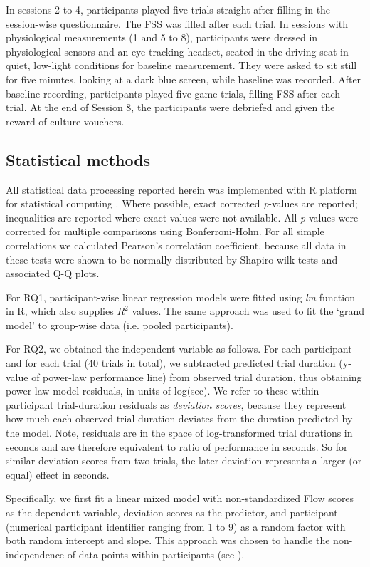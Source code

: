 \documentclass{frontierstyle/frontiersSCNS}
\begin{document}
In sessions 2 to 4, participants played five trials straight after filling in the session-wise questionnaire. The FSS was filled after each trial. In sessions with physiological measurements (1 and 5 to 8), participants were dressed in physiological sensors and an eye-tracking headset, seated in the driving seat in quiet, low-light conditions for baseline measurement. They were asked to sit still for five minutes, looking at a dark blue screen, while baseline was recorded. After baseline recording, participants played five game trials, filling FSS after each trial. At the end of Session 8, the participants were debriefed and given the reward of culture vouchers.

\subsection{Statistical methods}
All statistical data processing reported herein was implemented with {\sf R} platform for statistical computing \citep{R2014}. Where possible, exact corrected {\it p}-values are reported; inequalities are reported where exact values were not available. All {\it p}-values were corrected for multiple comparisons using Bonferroni-Holm. For all simple correlations we calculated Pearson's correlation coefficient, because all data in these tests were shown to be normally distributed by Shapiro-wilk tests and associated Q-Q plots.

For {\sf RQ1}, participant-wise linear regression models were fitted using {\it lm} function in {\sf R}, which also supplies $R^2$ values. The same approach was used to fit the `grand model' to group-wise data (i.e. pooled participants).

For {\sf RQ2}, we obtained the independent variable as follows. For each participant and for each trial (40 trials in total), we subtracted predicted trial duration (y-value of power-law performance line) from observed trial duration, thus obtaining power-law model residuals, in units of log(sec). We refer to these within-participant trial-duration residuals as {\it deviation scores}, because they represent how much each observed trial duration deviates from the duration predicted by the model. Note, residuals are in the space of log-transformed trial durations in seconds and are therefore equivalent to ratio of performance in seconds. So for similar deviation scores from two trials, the later deviation represents a larger (or equal) effect in seconds.

Specifically, we first fit a linear mixed model with non-standardized Flow scores as the dependent variable, deviation scores as the predictor, and participant (numerical participant identifier ranging from 1 to 9) as a random factor with both random intercept and slope. This approach was chosen to handle the non-independence of data points within participants (see \cite{Bates2015_lme4}).
\end{document}
